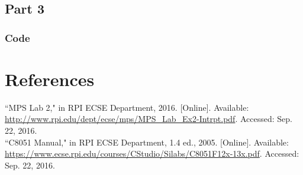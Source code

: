 \documentclass[12pt]{article}
\begin{document}
\subsection{Part 3}
	\subsubsection{Code}
		
	
\section{References} 
\noindent
``MPS Lab 2," in RPI ECSE Department, 2016. [Online]. Available: \url{http://www.rpi.edu/dept/ecse/mps/MPS_Lab_Ex2-Intrpt.pdf}. Accessed: Sep. 22, 2016.\\
\newline\noindent
``C8051 Manual," in RPI ECSE Department, 1.4 ed., 2005. [Online]. Available: \url{https://www.ecse.rpi.edu/courses/CStudio/Silabs/C8051F12x-13x.pdf}. Accessed: Sep. 22, 2016.
\end{document}
